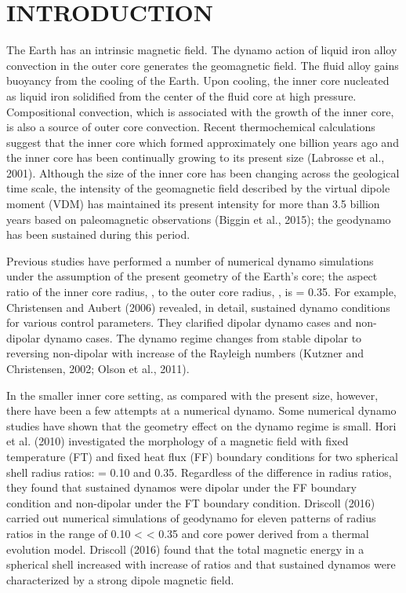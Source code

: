 \section{INTRODUCTION}
The Earth has an intrinsic magnetic field. The dynamo action of liquid iron alloy convection in the outer core generates the geomagnetic field. The fluid alloy gains buoyancy from the cooling of the Earth. Upon cooling, the inner core nucleated as liquid iron solidified from the center of the fluid core at high pressure. Compositional convection, which is associated with the growth of the inner core, is also a source of outer core convection. Recent thermochemical calculations suggest that the inner core which formed approximately one billion years ago and the inner core has been continually growing to its present size (Labrosse et al., 2001). Although the size of the inner core has been changing across the geological time scale, the intensity of the geomagnetic field described by the virtual dipole moment (VDM) has maintained its present intensity for more than 3.5 billion years based on paleomagnetic observations (Biggin et al., 2015); the geodynamo has been sustained during this period.

Previous studies have performed a number of numerical dynamo simulations under the assumption of the present geometry of the Earth’s core; the aspect ratio of the inner core radius, , to the outer core radius, , is = 0.35. For example, Christensen and Aubert (2006) revealed, in detail, sustained dynamo conditions for various control parameters. They clarified dipolar dynamo cases and non-dipolar dynamo cases. The dynamo regime changes from stable dipolar to reversing non-dipolar with increase of the Rayleigh numbers (Kutzner and Christensen, 2002; Olson et al., 2011).

In the smaller inner core setting, as compared with the present size, however, there have been a few attempts at a numerical dynamo. Some numerical dynamo studies have shown that the geometry effect on the dynamo regime is small. Hori et al. (2010) investigated the morphology of a magnetic field with fixed temperature (FT) and fixed heat flux (FF) boundary conditions for two spherical shell radius ratios: = 0.10 and 0.35. Regardless of the difference in radius ratios, they found that sustained dynamos were dipolar under the FF boundary condition and non-dipolar under the FT boundary condition. Driscoll (2016) carried out numerical simulations of geodynamo for eleven patterns of radius ratios in the range of 0.10 <  < 0.35 and core power derived from a thermal evolution model. Driscoll (2016) found that the total magnetic energy in a spherical shell increased with increase of  ratios and that sustained dynamos were characterized by a strong dipole magnetic field.

